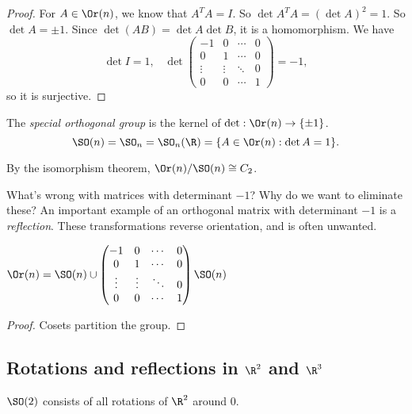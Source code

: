 \documentclass[a4paper]{article}
\begin{document}
\begin{proof}
  For $A\in \Or(n)$, we know that $A^TA = I$. So $\det A^TA = (\det A)^2 = 1$. So $\det A = \pm 1$. Since $\det(AB) = \det A\det B$, it is a homomorphism. We have
  \[
    \det I = 1,\;\;\;\det
    \begin{pmatrix}
      -1 & 0 &\cdots & 0\\
      0 & 1 & \cdots & 0\\
      \vdots & \vdots & \ddots & 0\\
      0 & 0 & \cdots & 1
    \end{pmatrix} = -1,
  \]
  so it is surjective.
\end{proof}

\begin{defi}
  The \emph{special orthogonal group} is the kernel of $\det: \Or(n) \to \{\pm 1\}$.
  \[
    \SO(n) =\SO_n = \SO_n(\R) = \{A\in \Or(n): \det A = 1\}.
  \]
\end{defi}
By the isomorphism theorem, $\Or(n)/\SO(n) \cong C_2$.

What's wrong with matrices with determinant $-1$? Why do we want to eliminate these? An important example of an orthogonal matrix with determinant $-1$ is a \emph{reflection}. These transformations reverse orientation, and is often unwanted.

\begin{lemma}
  $\Or(n) = \SO(n) \cup
  \begin{pmatrix}
    -1 & 0 &\cdots & 0\\
    0 & 1 & \cdots & 0\\
    \vdots & \vdots & \ddots & 0\\
    0 & 0 & \cdots &1
  \end{pmatrix}\SO(n)$
\end{lemma}

\begin{proof}
  Cosets partition the group.
\end{proof}
\subsection{Rotations and reflections in \texorpdfstring{$\R^2$}{R2} and \texorpdfstring{$\R^3$}{R3}}
\begin{lemma}
  $\SO(2)$ consists of all rotations of $\R^2$ around 0.
\end{lemma}
\end{document}
